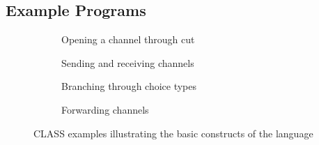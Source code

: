 \subsection{Example Programs}

\begin{figure}
    \centering
    \begin{subfigure}{.45\textwidth}
        \begin{class}
        \end{class}
        \caption{Opening a channel through cut}
        \label{fig:CLASSWaitCloseExample}
    \end{subfigure}
    \begin{subfigure}{.45\textwidth}
        \begin{class}
        \end{class}
        \caption{Sending and receiving channels}
        \label{fig:CLASSSendAndReceiveExample}
    \end{subfigure}
    \begin{subfigure}{.5\textwidth}
        \begin{class}
        \end{class}
        \caption{Branching through choice types}
        \label{fig:CLASSChoiceExample}
    \end{subfigure}
    \begin{subfigure}{.4\textwidth}
        \begin{class}
        \end{class}
        \caption{Forwarding channels}
        \label{fig:CLASSForwardExample}
    \end{subfigure}
    \caption{CLASS examples illustrating the basic constructs of the language}
\end{figure}

